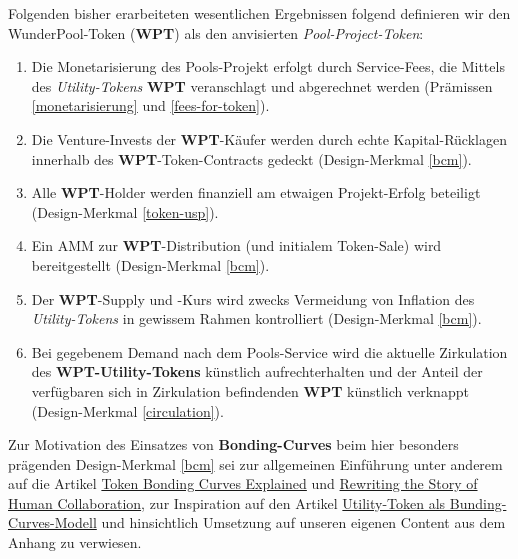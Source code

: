 \begin{Solution}
\label{wpt}
\vspace{0.2cm}

Folgenden bisher erarbeiteten wesentlichen Ergebnissen folgend definieren wir den WunderPool-Token (\textbf{WPT}) als den anvisierten \textit{Pool-Project-Token}:

\begin{enumerate}
	\item Die Monetarisierung des Pools-Projekt erfolgt durch Service-Fees, die Mittels des \textit{Utility-Tokens} \textbf{WPT} veranschlagt und abgerechnet werden (Prämissen \ref{monetarisierung} und \ref{fees-for-token}).
	\item Die Venture-Invests der \textbf{WPT}-Käufer werden durch echte Kapital-Rücklagen innerhalb des \textbf{WPT}-Token-Contracts gedeckt (Design-Merkmal \ref{bcm}).
	\item Alle \textbf{WPT}-Holder werden finanziell am etwaigen Projekt-Erfolg beteiligt \\ (Design-Merkmal \ref{token-usp}).
	\item Ein AMM zur \textbf{WPT}-Distribution (und initialem Token-Sale) wird bereitgestellt (Design-Merkmal \ref{bcm}).
	\item Der \textbf{WPT}-Supply und -Kurs wird zwecks Vermeidung von Inflation des \textit{Utility-Tokens} in gewissem Rahmen kontrolliert (Design-Merkmal \ref{bcm}).
	\item Bei gegebenem Demand nach dem Pools-Service wird die aktuelle Zirkulation des \textbf{WPT-Utility-Tokens} künstlich aufrechterhalten und der Anteil der verfügbaren sich in Zirkulation befindenden \textbf{WPT} künstlich verknappt (Design-Merkmal \ref{circulation}).
\end{enumerate}

\vspace{0.5cm}

Zur Motivation des Einsatzes von \textbf{Bonding-Curves} beim hier besonders prägenden Design-Merkmal \ref{bcm} sei zur allgemeinen Einführung unter anderem auf die Artikel \href{https://medium.com/coinmonks/token-bonding-curves-explained-7a9332198e0e}{Token Bonding Curves Explained} und \href{https://blog.goodaudience.com/rewriting-the-story-of-human-collaboration-c33a8a4cd5b8}{Rewriting the Story of Human Collaboration}, zur Inspiration auf den Artikel \href{https://medium.com/atchai/can-we-save-the-utility-token-55ef639370cf}{Utility-Token als Bunding-Curves-Modell} und hinsichtlich Umsetzung auf unseren eigenen Content aus dem Anhang zu  verwiesen.

\end{Solution}

